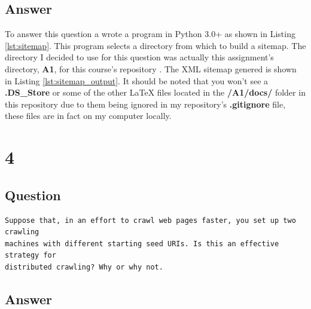\documentclass[letterpaper,11pt]{article}
\newcommand*{\srcPath}{../src}%
\begin{document}
\subsection*{Answer}

To answer this question a wrote a program in Python 3.0+ as shown in Listing \ref{lst:sitemap}. 
This program selects a directory from which to build a sitemap.
The directory I decided to use for this question was actually this assignment's directory, \textbf{A1}, for this course's repository \cite{github}.
The XML sitemap genered is shown in Listing \ref{lst:sitemap_output}. 
It should be noted that you won't see a \textbf{.DS\_Store} or some of the other LaTeX files located in the \textbf{/A1/docs/} folder in this 
repository due to them being ignored in my repository's \textbf{.gitignore} file, these files are in fact on my computer locally. 


 

 

\clearpage


\section*{4}

\subsection*{Question}

\begin{verbatim}
Suppose that, in an effort to crawl web pages faster, you set up two crawling 
machines with different starting seed URIs. Is this an effective strategy for 
distributed crawling? Why or why not.
\end{verbatim}

\subsection*{Answer}
\end{document}
